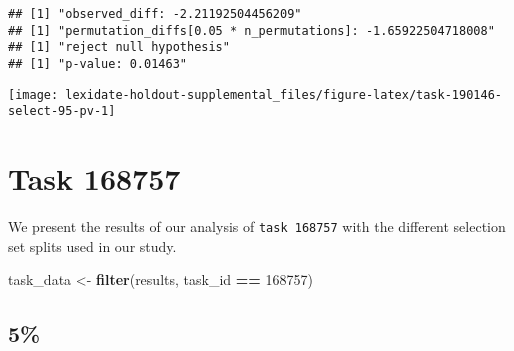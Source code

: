\documentclass[
]{book}
\newenvironment{Shaded}{\begin{snugshade}}{\end{snugshade}}
\newcommand{\AttributeTok}[1]{\textcolor[rgb]{0.13,0.29,0.53}{#1}}
\newcommand{\DecValTok}[1]{\textcolor[rgb]{0.00,0.00,0.81}{#1}}
\newcommand{\FunctionTok}[1]{\textcolor[rgb]{0.13,0.29,0.53}{\textbf{#1}}}
\newcommand{\NormalTok}[1]{#1}
\newcommand{\OtherTok}[1]{\textcolor[rgb]{0.56,0.35,0.01}{#1}}
\newcommand{\SpecialCharTok}[1]{\textcolor[rgb]{0.81,0.36,0.00}{\textbf{#1}}}
\newcommand{\StringTok}[1]{\textcolor[rgb]{0.31,0.60,0.02}{#1}}
\begin{document}
\begin{Shaded}
\end{Shaded}

\begin{verbatim}
## [1] "observed_diff: -2.21192504456209"
## [1] "permutation_diffs[0.05 * n_permutations]: -1.65922504718008"
## [1] "reject null hypothesis"
## [1] "p-value: 0.01463"
\end{verbatim}

\texttt{[image: lexidate-holdout-supplemental\_files/figure-latex/task-190146-select-95-pv-1]}

\hypertarget{task-168757}{%
\chapter{Task 168757}\label{task-168757}}

We present the results of our analysis of \texttt{task\ 168757} with the different selection set splits used in our study.

\begin{Shaded}
\begin{Highlighting}[]
\NormalTok{task\_data }\OtherTok{\textless{}{-}} \FunctionTok{filter}\NormalTok{(results, task\_id }\SpecialCharTok{==} \DecValTok{168757}\NormalTok{)}
\end{Highlighting}
\end{Shaded}

\hypertarget{section-20}{%
\section{5\%}\label{section-20}}
\end{document}
